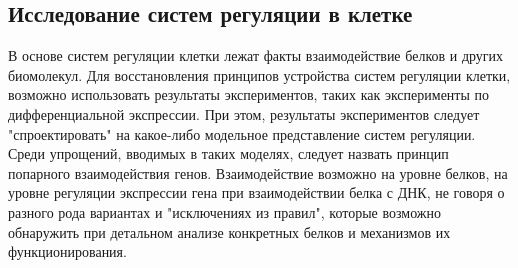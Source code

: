 





\subsection{Исследование систем регуляции в клетке} \label{sect_cellsystems}

В основе систем регуляции клетки лежат факты взаимодействие белков и других биомолекул. Для восстановления принципов устройства систем регуляции клетки, возможно использовать результаты экспериментов, таких как эксперименты по дифференциальной экспрессии. При этом, результаты экспериментов следует "спроектировать" на какое-либо модельное представление систем регуляции. Среди упрощений, вводимых в таких моделях, следует назвать принцип попарного взаимодействия генов. Взаимодействие возможно на уровне белков, на уровне регуляции экспрессии гена при взаимодействии белка с ДНК, не говоря о разного рода вариантах и "исключениях из правил", которые возможно обнаружить при детальном анализе конкретных белков и механизмов их функционирования.

